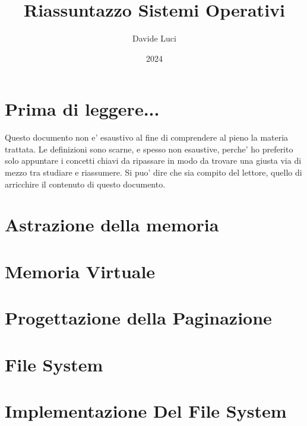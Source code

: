 \documentclass{article}
\title{Riassuntazzo Sistemi Operativi}
\author{Davide Luci}
\date{2024}
\begin{document}
    \maketitle
    \tableofcontents
    \newpage


    \setlength{\parindent}{0pt}
    \section{ Prima di leggere...}
    Questo documento non e' esaustivo al fine di comprendere al pieno la materia trattata.
    Le definizioni sono scarne, e spesso non esaustive, perche' ho preferito solo appuntare i concetti chiavi
    da ripassare in modo da trovare una giusta via di mezzo tra studiare e riassumere. Si puo' dire che sia compito del 
    lettore, quello di arricchire il contenuto di questo documento.

    \section {Astrazione della memoria}
        
    \section {Memoria Virtuale}
        
    \section {Progettazione della Paginazione}
        

    \newpage
    \section {File System}
        
        
    \newpage
    \section {Implementazione Del File System}
        
    
\end{document}
